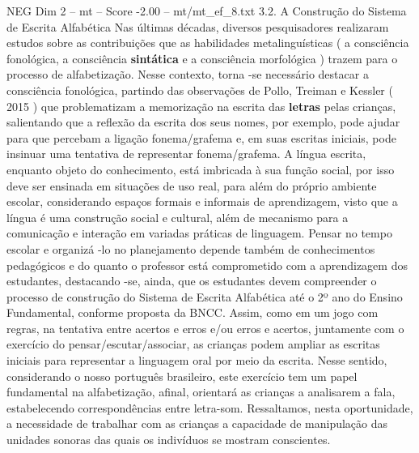 \begin{textsample}{NEG Dim 2 – mt – Score -2.00 – mt/mt\_ef\_8.txt}  \label{ex:f2_neg_064}
3.2.
A Construção do Sistema de Escrita Alfabética Nas últimas décadas, diversos pesquisadores realizaram estudos sobre as contribuições que as habilidades metalinguísticas ( a consciência fonológica, a consciência \textbf{sintática} e a consciência morfológica ) trazem para o processo de alfabetização.
Nesse contexto, torna -se necessário destacar a consciência fonológica, partindo das observações de Pollo, Treiman e Kessler ( 2015 ) que problematizam a memorização na escrita das \textbf{letras} pelas crianças, salientando que a reflexão da escrita dos seus nomes, por exemplo, pode ajudar para que percebam a ligação fonema/grafema e, em suas escritas iniciais, pode insinuar uma tentativa de representar fonema/grafema.
A língua escrita, enquanto objeto do conhecimento, está imbricada à sua função social, por isso deve ser ensinada em situações de uso real, para além do próprio ambiente escolar, considerando espaços formais e informais de aprendizagem, visto que a língua é uma construção social e cultural, além de mecanismo para a comunicação e interação em variadas práticas de linguagem.
Pensar no tempo escolar e organizá -lo no planejamento depende também de conhecimentos pedagógicos e do quanto o professor está comprometido com a aprendizagem dos estudantes, destacando -se, ainda, que os estudantes devem compreender o processo de construção do Sistema de Escrita Alfabética até o 2º ano do Ensino Fundamental, conforme proposta da BNCC.
Assim, como em um jogo com regras, na tentativa entre acertos e erros e/ou erros e acertos, juntamente com o exercício do pensar/escutar/associar, as crianças podem ampliar as escritas iniciais para representar a linguagem oral por meio da escrita.
Nesse sentido, considerando o nosso português brasileiro, este exercício tem um papel fundamental na alfabetização, afinal, orientará as crianças a analisarem a fala, estabelecendo correspondências entre letra-som.
Ressaltamos, nesta oportunidade, a necessidade de trabalhar com as crianças a capacidade de manipulação das unidades sonoras das quais os indivíduos se mostram conscientes.

\end{textsample}
